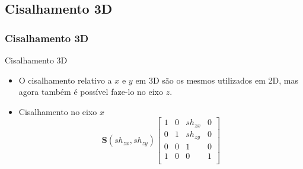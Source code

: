 \documentclass{beamer}
\begin{document}
\subsection{Cisalhamento 3D}
\begin{frame}
\frametitle{Cisalhamento 3D}
	\begin{block}{Cisalhamento 3D}
		\begin{itemize}
			\item O cisalhamento relativo a $x$ e $y$ em 3D são os mesmos utilizados em 2D, mas agora também é possível faze-lo no eixo $z$. 
			\item Cisalhamento no eixo $x$\\
			\begin{equation*}
				\textbf{S}(sh_{zx},sh_{zy})\begin{bmatrix}
					1	&	0	&	sh_{zx}	&	0 \\
					0	&	1	&	sh_{zy}	&	0 \\
					0	&	0	&	1	&	0 \\
					1	&	0	&	0	&	1 \\
				\end{bmatrix}
			\end{equation*}
			
		\end{itemize}
	\end{block}
\end{frame}

\end{document}
